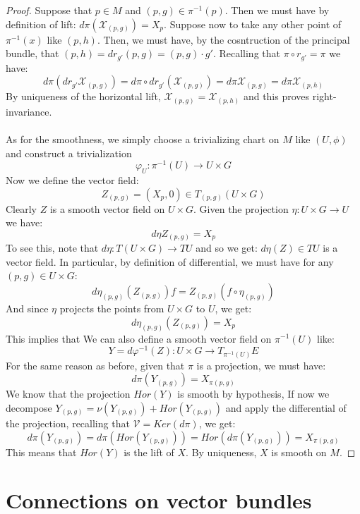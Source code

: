 \documentclass[12pt,a4paper]{report}
\theoremstyle{definition}
\theoremstyle{Theorem}
\theoremstyle{definition}
\theoremstyle{definition}
\theoremstyle{definition}
\begin{document}
		\begin{proof}
			Suppose that $p\in M$ and $(p,g)\in\pi^{-1}(p)$. Then we must have by definition of lift: $d\pi(\mathcal{X}_{(p,g)})=X_p$. Suppose now to take any other point of $\pi^{-1}(x)$ like $(p,h)$. Then, we must have, by the cosntruction of the principal bundle, that $(p,h)=dr_{g'}(p,g)=(p,g)\cdot g'$. Recalling that $\pi\circ r_{g'}=\pi$ we have:
			$$d\pi(dr_{g'}\mathcal{X}_{(p,g)})=d\pi\circ dr_{g'}(\mathcal{X}_{(p,g)})=d\pi\mathcal{X}_{(p,g)}=d\pi\mathcal{X}_{(p,h)}$$
			By uniqueness of the horizontal lift, $\mathcal{X}_{(p,g)}=\mathcal{X}_{(p,h)}$ and this proves right-invariance.\\
			\\
			As for the smoothness, we simply choose a trivializing chart on $M$ like $(U,\phi)$ and construct a trivialization 
			$$\varphi_U:\pi^{-1}(U)\rightarrow U\times G$$
			Now we define the vector field:
			$$Z_{(p,g)}=(X_p,0)\in T_{(p,g)}(U\times G)$$
			Clearly $Z$ is a smooth vector field on $U\times G$. Given the projection $\eta:U\times G\rightarrow U$ we have:
			$$d\eta Z_{(p,g)}=X_p$$
			To see this, note that $d\eta:T(U\times G)\rightarrow TU$ and so we get: $d\eta(Z)\in TU$ is a vector field. In particular, by definition of differential, we must have for any $(p,g)\in U\times G$:
			$$d\eta_{(p,g)}(Z_{(p,g)})f=Z_{(p,g)}(f\circ \eta_{(p,g)})$$
			And since $\eta$ projects the points from $U\times G$ to $U$, we get:
			$$d\eta_{(p,g)}(Z_{(p,g)})=X_p$$
			This implies that
			We can also define a smooth vector field on $\pi^{-1}(U)$ like:
			$$Y=d\varphi^{-1}(Z):U\times G \rightarrow T_{\pi^{-1}(U)}E$$
			For the same reason as before, given that $\pi$ is a projection, we must have:
			$$d\pi(Y_{(p,g)})=X_{\pi(p,g)}$$
			We know that the projection $Hor(Y)$ is smooth by hypothesis, If now we decompose $Y_{(p,g)}=\nu(Y_{(p,g)})+Hor(Y_{(p,g)})$ and apply the differential of the projection, recalling that $\mathcal{V}=Ker(d\pi)$, we get:
			$$d\pi(Y_{(p,g)})=d\pi(Hor(Y_{(p,g)}))=Hor(d\pi(Y_{(p,g)}))=X_{\pi(p,g)}$$
			This means that $Hor(Y)$ is the lift of $X$. By uniqueness, $X$ is smooth on $M$.
		\end{proof}
		\chapter{Connections on vector bundles}
\end{document}
